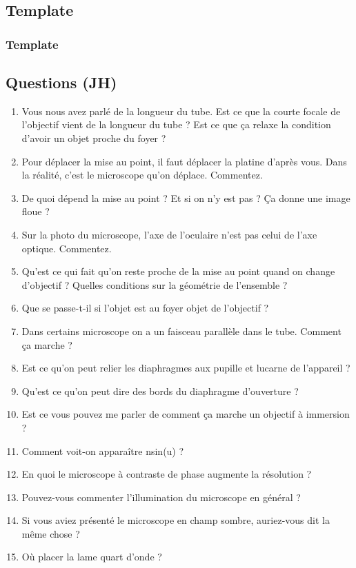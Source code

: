\subsection{Template}

\subsubsection{Template}

\subsection*{Questions (JH)}

\begin{enumerate}
\item Vous nous avez parlé de la longueur du tube. Est ce que la courte focale de l'objectif vient de la longueur du tube ? Est ce que ça relaxe la condition d'avoir un objet proche du foyer ?
\item Pour déplacer la mise au point, il faut déplacer la platine d'après vous. Dans la réalité, c'est le microscope qu'on déplace. Commentez.
\item De quoi dépend la mise au point ? Et si on n'y est pas ? Ça donne une image floue ?
\item Sur la photo du microscope, l'axe de l'oculaire n'est pas celui de l'axe optique. Commentez.
\item Qu'est ce qui fait qu'on reste proche de la mise au point quand on change d'objectif ? Quelles conditions sur la géométrie de l'ensemble ?
\item Que se passe-t-il si l'objet est au foyer objet de l'objectif ?
\item Dans certains microscope on a un faisceau parallèle dans le tube. Comment ça marche ?
\item Est ce qu'on peut relier les diaphragmes aux pupille et lucarne de l'appareil ?
\item Qu'est ce qu'on peut dire des bords du diaphragme d'ouverture ?
\item Est ce vous pouvez me parler de comment ça marche un objectif à immersion ?
\item Comment voit-on apparaître nsin(u) ?
\item En quoi le microscope à contraste de phase augmente la résolution ?
\item Pouvez-vous commenter l'illumination du microscope en général ?
\item Si vous aviez présenté le microscope en champ sombre, auriez-vous dit la même chose ?
\item Où placer la lame quart d'onde ?
\end{enumerate}

\newpage